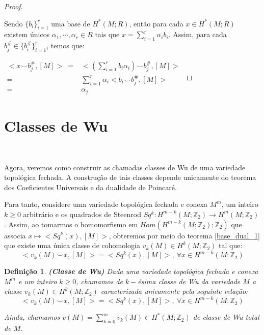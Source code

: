 \documentclass[12pt,oneside]{book} %
\newtheorem{defi}   {\hspace{0.5cm}Defini\c c\~ao}[chapter]
\newcommand{\ds}{\displaystyle}
\newcommand{\Z}{\mathbb{Z}}
\newcommand{\ccup}{\smile}
\begin{document}
\begin{proof}
	
	\
	
	\par Sendo $\{b_{i}\}_{i=1}^{r}$ uma base de $H^{*}(M;R)$, então para cada $x\in H^{*}(M;R)$ existem únicos $\alpha_{1},\cdots, \alpha_{r}\in R$ tais que $x=\ds\sum_{i=1}^{r}\alpha_{i}b_{i}$. Assim, para cada $b^{\#}_{j}\in \{b^{\#}_{i}\}_{i=1}^{r}$, temos que: \newline
	
	$ \begin{array}{rl}
		<x\ccup b_{j}^{\#},[M]> \ = & <\left( \ds\sum_{i=1}^{r}b_{i}\alpha_{i} \right) \ccup b_{j}^{\#},[M]> \\
		= & \ds\sum_{i=1}^{r}\alpha_{i}<b_{i}\ccup b^{\#}_{j},[M]> \\
		= & \alpha_{j}
	\end{array} $
	
\end{proof}



\section{Classes de Wu}\label{ap_wu}

\

\par Agora, veremos como construir as chamadas classes de Wu de uma variedade topológica fechada. A construção de tais classes depende unicamente do teorema dos Coeficientes Universais e da dualidade de Poincaré.

\par Para tanto, considere uma variedade topológica fechada e conexa $M^{m}$, um inteiro $k\geq 0$ arbitrário e os quadrados de Steenrod $Sq^{k}:H^{m-k}(M;\Z_{2})\to H^{m}(M;\Z_{2})$. Assim, ao tomarmos o homomorfismo em $Hom(H^{m-k}(M;\Z_{2});\Z_{2})$ que associa $x\mapsto <Sq^{k}(x),[M]>$, obteremos por meio do teorema \ref{base_dual_1} que existe uma única classe de cohomologia $v_{k}(M)\in H^{k}(M;\Z_{2})$ tal que:
$$ <v_{k}(M)\ccup x,[M]>=<Sq^{k}(x),[M]>, \ \forall x\in H^{m-k}(M;\Z_{2}) $$

\begin{defi}{\bf (Classe de Wu)}
	Dada uma variedade topológica fechada e conexa $M^{m}$ e um inteiro $k\geq 0$, chamamos de $k-$ésima classe de Wu da variedade $M$ a classe $v_{k}(M)\in H^{k}(M;\Z_{2})$ caracterizada unicamente pela seguinte relação:
	$$ <v_{k}(M)\ccup x,[M]>=<Sq^{k}(x),[M]>, \ \forall x\in H^{m-k}(M;\Z_{2}) $$
	
	\par Ainda, chamamos $v(M)=\ds\sum_{k=0}^{m} v_{k}(M)\in H^{*}(M;\Z_{2})$ de classe de Wu total de $M$.
\end{defi}
\end{document}
